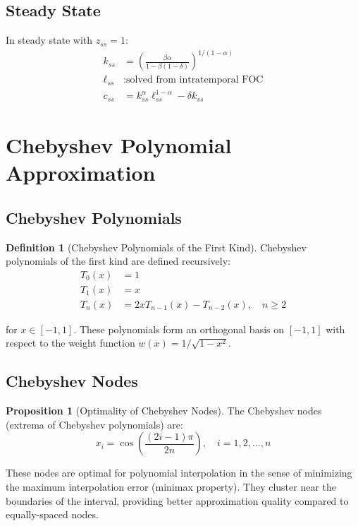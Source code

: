 \documentclass[11pt]{article}
\theoremstyle{definition}
\newtheorem{definition}{Definition}[section]
\newtheorem{proposition}{Proposition}[section]
\begin{document}
\subsection{Steady State}

In steady state with $z_{ss} = 1$:
\begin{align}
k_{ss} &= \left( \frac{\beta \alpha}{1 - \beta(1-\delta)} \right)^{1/(1-\alpha)} \\
\ell_{ss} &: \text{solved from intratemporal FOC} \\
c_{ss} &= k_{ss}^{\alpha} \ell_{ss}^{1-\alpha} - \delta k_{ss}
\end{align}

\section{Chebyshev Polynomial Approximation}

\subsection{Chebyshev Polynomials}

\begin{definition}[Chebyshev Polynomials of the First Kind]
Chebyshev polynomials of the first kind are defined recursively:
\begin{align}
T_0(x) &= 1 \\
T_1(x) &= x \\
T_n(x) &= 2x T_{n-1}(x) - T_{n-2}(x), \quad n \geq 2
\end{align}

for $x \in [-1, 1]$. These polynomials form an orthogonal basis on $[-1,1]$ with respect to the weight function $w(x) = 1/\sqrt{1-x^2}$.
\end{definition}

\subsection{Chebyshev Nodes}

\begin{proposition}[Optimality of Chebyshev Nodes]
The Chebyshev nodes (extrema of Chebyshev polynomials) are:
\begin{equation}
x_i = \cos\left( \frac{(2i-1)\pi}{2n} \right), \quad i = 1, 2, \ldots, n
\end{equation}

These nodes are optimal for polynomial interpolation in the sense of minimizing the maximum interpolation error (minimax property). They cluster near the boundaries of the interval, providing better approximation quality compared to equally-spaced nodes.
\end{proposition}
\end{document}
